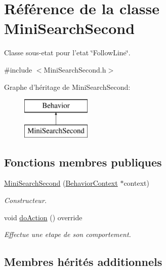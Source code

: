\hypertarget{class_mini_search_second}{\section{Référence de la classe Mini\-Search\-Second}
\label{class_mini_search_second}
}


Classe sous-\/etat pour l'etat \char`\"{}\-Follow\-Line\char`\"{}.  




{\ttfamily \#include $<$Mini\-Search\-Second.\-h$>$}

Graphe d'héritage de Mini\-Search\-Second\-:\begin{figure}[H]
\begin{center}
\leavevmode
\includegraphics[height=2.000000cm]{class_mini_search_second}
\end{center}
\end{figure}
\subsection*{Fonctions membres publiques}
{\bf }\par
\begin{DoxyCompactItemize}
\item 
\hyperlink{class_mini_search_second_aa60f43e503ee0ad9b7806df496e12fc6}{Mini\-Search\-Second} (\hyperlink{class_behavior_context}{Behavior\-Context} $\ast$context)
\begin{DoxyCompactList}\small\item\em Constructeur. \end{DoxyCompactList}\item 
void \hyperlink{class_mini_search_second_aff8876aa2e43530ae1b10fb45579eeef}{do\-Action} () override
\begin{DoxyCompactList}\small\item\em Effectue une etape de son comportement. \end{DoxyCompactList}\end{DoxyCompactItemize}

\subsection*{Membres hérités additionnels}


